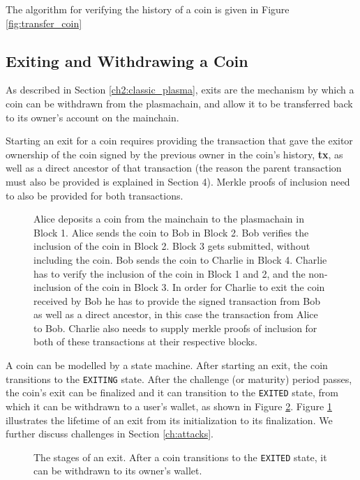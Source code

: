 The algorithm for verifying the history of a coin is given in Figure \ref{fig:transfer_coin}



\subsection{Exiting and Withdrawing a Coin} \label{exiting_withdrawing}
As described in Section \ref{ch2:classic_plasma}, exits are the mechanism by
which a coin can be withdrawn from the plasmachain, and allow it to be
transferred back to its owner's account on the mainchain. 

Starting an exit for a coin requires providing the transaction that gave the
exitor ownership of the coin signed by the previous owner in the coin's history, \textbf{tx}, as well
as a direct ancestor of that transaction (the reason the parent transaction must also be provided is explained in Section 4). Merkle proofs of inclusion need to also be provided for both transactions.

\begin{figure}[H]
	\caption{
        Alice deposits a coin from the mainchain to the plasmachain in Block 1. Alice sends the coin to Bob in Block 2. Bob verifies the inclusion of the coin in Block 2. Block 3 gets submitted, without including the coin. Bob sends the coin to Charlie in Block 4. Charlie has to verify the inclusion of the coin in Block 1 and 2, and the non-inclusion of the coin in Block 3. 
        In order for Charlie to exit the coin received by Bob he has to provide
        the signed transaction from Bob as well as a direct ancestor, in this
        case the transaction from Alice to Bob. Charlie also needs to supply
        merkle proofs of inclusion for both of these transactions at their
        respective blocks. 
	}
    \label{fig:exit_lifetime}
\end{figure}

A coin can be modelled by a state machine. After starting an exit, the coin transitions to the \texttt{EXITING} 
state. After the challenge (or maturity) period passes, 
the coin's exit can be finalized and it can transition to the \texttt{EXITED} 
state, from which it can be withdrawn to a user's wallet, 
as shown in Figure
\ref{fig:exit_state_machine}. Figure \ref{fig:exit_lifetime} illustrates the 
lifetime of an exit from its initialization to its finalization. 
We further discuss challenges in Section \ref{ch:attacks}.
\begin{figure}[H]
	\caption{
        The stages of an exit. After a coin transitions to the \texttt{EXITED}
        state, it can be withdrawn to its owner's wallet.
	}
    \label{fig:exit_state_machine}
\end{figure}


